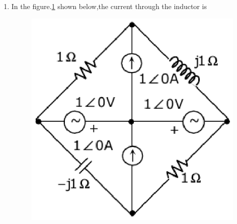 \documentclass[journal,12pt,twocolumn]{IEEEtran}
\begin{document}
\begin{enumerate}
\item In the figure.\ref{fig84} shown below,the current through the inductor is
\begin{enumerate}
\setlength\itemsep{2em}
\begin{figure}[!h]
\begin{center}
\includegraphics[scale=0.7]{./figs/fig84.eps}
\caption{}
\label{fig84}
\end{center}
\end{figure}
\end{enumerate}


\end{enumerate}
\end{document}
